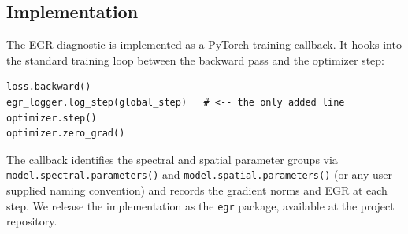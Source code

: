 \subsection{Implementation}

The EGR diagnostic is implemented as a PyTorch training callback. It
hooks into the standard training loop between the backward pass and
the optimizer step:
\begin{verbatim}
loss.backward()
egr_logger.log_step(global_step)   # <-- the only added line
optimizer.step()
optimizer.zero_grad()
\end{verbatim}
The callback identifies the spectral and spatial parameter groups via
\verb|model.spectral.parameters()| and \verb|model.spatial.parameters()|
(or any user-supplied naming convention) and records the gradient
norms and EGR at each step. We release the implementation as the
\verb|egr| package, available at the project repository.
